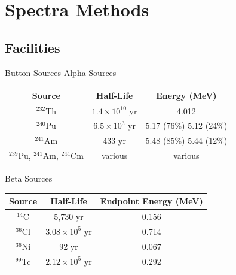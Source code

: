 
% 
%
\section{Spectra Methods}


\subsection{Facilities}
\begin{frame}{Button Sources}
	\centering
	Alpha Sources
	\begin{table}[h]
		\tiny
		\begin{tabular}{c | c c}
		Source & Half-Life & Energy (MeV) \\
		\hline
		\hline
		${}^{232}$Th & $1.4\times10^{10}$ yr & 4.012 \\
		${}^{240}$Pu & $6.5\times10^{3}$ yr & 5.17 (76\%) 5.12 (24\%) \\
		${}^{241}$Am & 433 yr & 5.48 (85\%) 5.44 (12\%) \\
		${}^{239}$Pu, ${}^{241}$Am, ${}^{244}$Cm  & various & various \\
		\hline
		\end{tabular}
	\end{table}
	Beta Sources
	\begin{table}[h]
		\tiny
		\begin{tabular}{c | c c}
		Source & Half-Life & Endpoint Energy (MeV)\\
		\hline
		\hline
		${}^{14}$C &  5,730 yr & 0.156 \\
		${}^{36}$Cl & $3.08\times10^{5}$ yr & 0.714 \\
		${}^{36}$Ni &  92 yr & 0.067 \\
		${}^{99}$Tc & $2.12\times10^{5}$ yr & 0.292 \\
		\hline
		\end{tabular}
	\end{table}
\end{frame}

